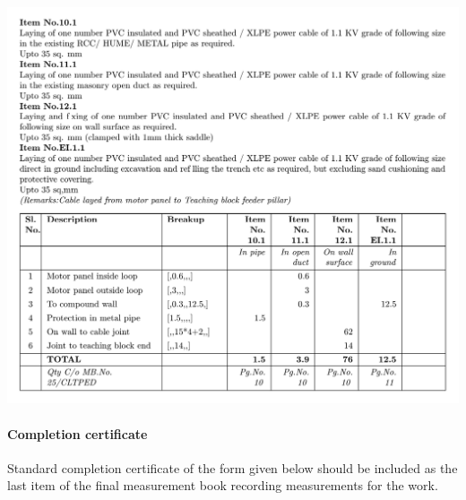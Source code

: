 \documentclass[twoside,a4paper]{refart}
\newenvironment{fminipage}[1]%
{\begin{Sbox}\begin{minipage}{#1}\begin{center}}%
		{\end{center}\end{minipage}\end{Sbox}\shadowbox{\TheSbox}}
\begin{document}
	 \begin{center}
	 	\begin{fminipage}{\textwidth}
	 		\includegraphics[width=1\linewidth]{figures/measurementLLLLL.pdf}
	 	\end{fminipage}
	 \end{center}
	 
	 \paragraph{Completion certificate}
	 
	 Standard completion certificate of the form given below should be included as the last item of the final measurement book recording measurements for the work.
	 
\end{document}
